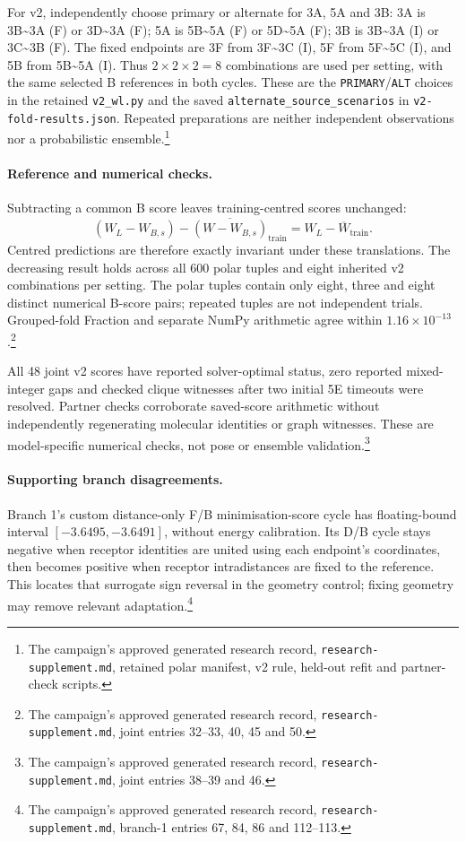 \documentclass{article}
\newcommand{\rr}[1]{\footnote{The campaign's approved generated research record, \texttt{research-supplement.md}, #1.}}
\begin{document}
For v2, independently choose primary or alternate for 3A, 5A and 3B: 3A is 3B\textasciitilde{}3A (F) or 3D\textasciitilde{}3A (F); 5A is 5B\textasciitilde{}5A (F) or 5D\textasciitilde{}5A (F); 3B is 3B\textasciitilde{}3A (I) or 3C\textasciitilde{}3B (F). The fixed endpoints are 3F from 3F\textasciitilde{}3C (I), 5F from 5F\textasciitilde{}5C (I), and 5B from 5B\textasciitilde{}5A (I). Thus \(2\times2\times2=8\) combinations are used per setting, with the same selected B references in both cycles. These are the \texttt{PRIMARY}/\texttt{ALT} choices in the retained \texttt{v2\_wl.py} and the saved \texttt{alternate\_source\_scenarios} in \texttt{v2-fold-results.json}. Repeated preparations are neither independent observations nor a probabilistic ensemble.\rr{retained polar manifest, v2 rule, held-out refit and partner-check scripts}

\paragraph{Reference and numerical checks.}
Subtracting a common B score leaves training-centred scores unchanged:
\[
 (W_L-W_{B,s})-\overline{(W-W_{B,s})}_{\mathrm{train}}
 =W_L-\overline W_{\mathrm{train}}.
\]
Centred predictions are therefore exactly invariant under these translations. The decreasing result holds across all 600 polar tuples and eight inherited v2 combinations per setting. The polar tuples contain only eight, three and eight distinct numerical B-score pairs; repeated tuples are not independent trials. Grouped-fold Fraction and separate NumPy arithmetic agree within \(1.16\times10^{-13}\).\rr{joint entries 32--33, 40, 45 and 50}

All 48 joint v2 scores have reported solver-optimal status, zero reported mixed-integer gaps and checked clique witnesses after two initial 5E timeouts were resolved. Partner checks corroborate saved-score arithmetic without independently regenerating molecular identities or graph witnesses. These are model-specific numerical checks, not pose or ensemble validation.\rr{joint entries 38--39 and 46}

\paragraph{Supporting branch disagreements.}
Branch 1's custom distance-only F/B minimisation-score cycle has floating-bound interval \([-3.6495,-3.6491]\), without energy calibration. Its D/B cycle stays negative when receptor identities are united using each endpoint's coordinates, then becomes positive when receptor intradistances are fixed to the reference. This locates that surrogate sign reversal in the geometry control; fixing geometry may remove relevant adaptation.\rr{branch-1 entries 67, 84, 86 and 112--113}
\end{document}
